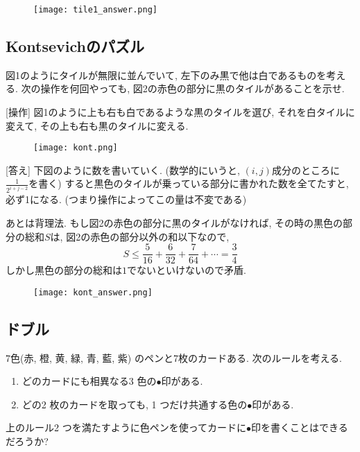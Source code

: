 \documentclass[dvipdfmx,a4paper,12pt]{article} %
\theoremstyle{definition}
\theoremstyle{remark}
\numberwithin{equation}{section}
\begin{document}
\begin{figure}[htbp]
\begin{center}
\texttt{[image: tile1\_answer.png]}
\end{center}
\end{figure}


\subsection{Kontsevichのパズル}
\begin{tcolorbox}[mybox]
図1のようにタイルが無限に並んでいて, 左下のみ黒で他は白であるものを考える.
次の操作を何回やっても, 図2の赤色の部分に黒のタイルがあることを示せ. 

\vspace{5pt}
[操作] 図1のように上も右も白であるような黒のタイルを選び, それを白タイルに変えて, その上も右も黒のタイルに変える.
\end{tcolorbox}
\begin{figure}[htbp]
\begin{center}
\texttt{[image: kont.png]}
\end{center}
\end{figure}

[答え]
下図のように数を書いていく. 
(数学的にいうと, $(i,j)$成分のところに$\frac{1}{2^{i+j -2}}$を書く)
すると黒色のタイルが乗っている部分に書かれた数を全てたすと, 必ず1になる.
(つまり操作によってこの量は不変である)

あとは背理法. もし図2の赤色の部分に黒のタイルがなければ, 
その時の黒色の部分の総和$S$は, 図2の赤色の部分以外の和以下なので, 
$$
S \le \frac{5}{16}+\frac{6}{32}+ \frac{7}{64}+  \cdots = \frac{3}{4}
$$
しかし黒色の部分の総和は$1$でないといけないので矛盾. 

\begin{figure}[htbp]
\begin{center}
\texttt{[image: kont\_answer.png]}
\end{center}
\end{figure}


\subsection{ドブル}

\begin{tcolorbox}[mybox]
7色(赤, 橙, 黄, 緑, 青, 藍, 紫) のペンと7枚のカードある. 次のルールを考える.
\begin{enumerate}
    \setlength{\parskip}{0cm} 
  \setlength{\itemsep}{0cm} 
\item どのカードにも相異なる3 色の$\bullet$印がある.
\item どの2 枚のカードを取っても, 1 つだけ共通する色の$\bullet$印がある.
\end{enumerate}
上のルール2 つを満たすように色ペンを使ってカードに$\bullet$印を書くことはできるだろうか?
\end{tcolorbox}
\end{document}
